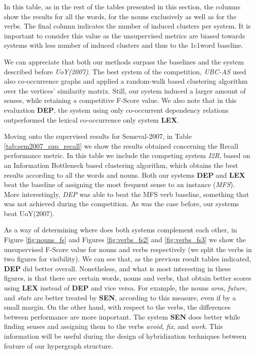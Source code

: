 In this table, as in the rest of the tables presented in this section, the columns show the results for all the words, for the nouns exclusively as well as for the verbs. The final column indicates the number of induced clusters per system. It is important to consider this value as the unsupervised metrics are biased towards systems with less number of induced clusters and thus to the 1c1word baseline.

We can appreciate that both our methods surpass the baselines and the system described before \textit{UoY(2007)}. The best system of the competition, \textit{UBC-AS} used also co-occurrence graphs and applied a random-walk based clustering algorithm over the vertices' similarity matrix. Still, our system induced a larger amount of senses, while retaining a competitive F-Score value. We also note that in this evaluation \textbf{DEP}, the system using only co-occurrent dependency relations outperformed the lexical co-occurrence only system \textbf{LEX}.

Moving onto the supervised results for Semeval-2007, in Table \ref{tab:sem2007_sup_recall} we show the results obtained concerning the Recall performance metric.  In this table we include the competing system \textit{I2R}, based on an Information Bottleneck based clustering algorithm, which obtains the best results according to all the words and nouns. Both our systems \textbf{DEP} and \textbf{LEX} beat the baseline of assigning the most frequent sense to an instance (\textit{MFS}). More interestingly, \textit{DEP} was able to beat the MFS verb baseline, something that was not achieved during the competition. As was the case before, our systems beat UoY(2007).




As a way of determining where does both systems complement each other, in Figure \ref{fig:nouns_fs} and Figures  \ref{fig:verbs_fs2} and \ref{fig:verbs_fs3} we show the unsupervised F-Score value for nouns and verbs respectively (we split the verbs in two figures for visibility). We can see that, as the previous result tables indicated, \textbf{DEP} did better overall. Nonetheless, and what is most interesting in these figures, is that there are certain words, nouns and verbs, that obtain better scores using \textbf{LEX} instead of \textbf{DEP} and vice versa. For example, the nouns \textit{area}, \textit{future}, and \textit{state} are better treated by \textbf{SEN}, according to this measure, even if by a small margin. On the other hand, with respect to the verbs, the differences between performance are more important. The system \textbf{SEN} does better while finding senses and assigning them to the verbs \textit{avoid}, \textit{fix}, and \textit{work}. This information will be useful during the design of hybridization techniques between feature of our hypergraph structure.

